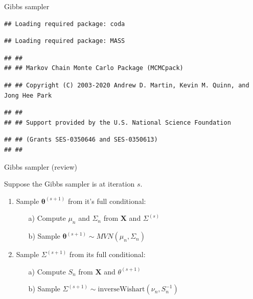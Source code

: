 \documentclass[
  ignorenonframetext,
]{beamer}
\newcommand{\btheta}{{\bm\theta}}
\newcommand{\bX}   {\bm{X}}
\begin{document}
\begin{frame}[fragile]{Gibbs sampler}
\protect\hypertarget{gibbs-sampler-1}{}

\begin{verbatim}
## Loading required package: coda
\end{verbatim}

\begin{verbatim}
## Loading required package: MASS
\end{verbatim}

\begin{verbatim}
## ##
## ## Markov Chain Monte Carlo Package (MCMCpack)
\end{verbatim}

\begin{verbatim}
## ## Copyright (C) 2003-2020 Andrew D. Martin, Kevin M. Quinn, and Jong Hee Park
\end{verbatim}

\begin{verbatim}
## ##
## ## Support provided by the U.S. National Science Foundation
\end{verbatim}

\begin{verbatim}
## ## (Grants SES-0350646 and SES-0350613)
## ##
\end{verbatim}

\end{frame}

\begin{frame}{Gibbs sampler (review)}
\protect\hypertarget{gibbs-sampler-review}{}

Suppose the Gibbs sampler is at iteration \(s.\)

\begin{enumerate}
\item Sample $\btheta^{(s+1)}$ from it's full conditional:
\begin{enumerate}
\item[a)] Compute $\mu_n$ and $\Sigma_n$ from $\bX$ and $\Sigma^{(s)}$
\item[b)] Sample $\btheta^{(s+1)}\sim MVN(\mu_n, \Sigma_n)$
\end{enumerate}
\item Sample $\Sigma^{(s+1)}$ from its full conditional:
\begin{enumerate}
\item[a)] Compute $S_n$ from $\bX$ and $\theta^{(s+1)}$
\item[b)] Sample $\Sigma^{(s+1)} \sim \text{inverseWishart}(\nu_n, S_n^{-1})$
\end{enumerate}
\end{enumerate}

\end{frame}
\end{document}
